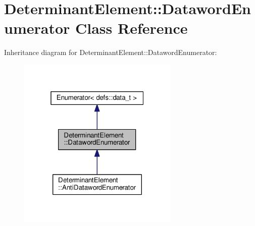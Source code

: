 \hypertarget{classDeterminantElement_1_1DatawordEnumerator}{}\section{Determinant\+Element\+:\+:Dataword\+Enumerator Class Reference}
\label{classDeterminantElement_1_1DatawordEnumerator}


Inheritance diagram for Determinant\+Element\+:\+:Dataword\+Enumerator\+:\nopagebreak
\begin{figure}[H]
\begin{center}
\leavevmode
\includegraphics[width=217pt]{classDeterminantElement_1_1DatawordEnumerator__inherit__graph}
\end{center}
\end{figure}



